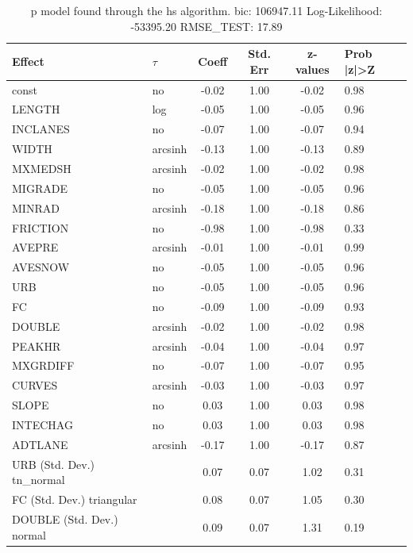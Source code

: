 \begin{table}
	\caption{p model found through the hs algorithm. bic: 106947.11 Log-Likelihood: -53395.20 RMSE_TEST: 17.89}
	\begin{center}
		\begin{tabular}{|l|l|c|c|c|l|}
			\hline
			Effect & $\tau$ & Coeff & Std. Err & z-values & Prob |z|>Z \\
			\hline
			const & no & -0.02 & 1.00 & -0.02 & 0.98 \\
			\hline
			LENGTH & log & -0.05 & 1.00 & -0.05 & 0.96 \\
			\hline
			INCLANES & no & -0.07 & 1.00 & -0.07 & 0.94 \\
			\hline
			WIDTH & arcsinh & -0.13 & 1.00 & -0.13 & 0.89 \\
			\hline
			MXMEDSH & arcsinh & -0.02 & 1.00 & -0.02 & 0.98 \\
			\hline
			MIGRADE & no & -0.05 & 1.00 & -0.05 & 0.96 \\
			\hline
			MINRAD & arcsinh & -0.18 & 1.00 & -0.18 & 0.86 \\
			\hline
			FRICTION & no & -0.98 & 1.00 & -0.98 & 0.33 \\
			\hline
			AVEPRE & arcsinh & -0.01 & 1.00 & -0.01 & 0.99 \\
			\hline
			AVESNOW & no & -0.05 & 1.00 & -0.05 & 0.96 \\
			\hline
			URB & no & -0.05 & 1.00 & -0.05 & 0.96 \\
			\hline
			FC & no & -0.09 & 1.00 & -0.09 & 0.93 \\
			\hline
			DOUBLE & arcsinh & -0.02 & 1.00 & -0.02 & 0.98 \\
			\hline
			PEAKHR & arcsinh & -0.04 & 1.00 & -0.04 & 0.97 \\
			\hline
			MXGRDIFF & no & -0.07 & 1.00 & -0.07 & 0.95 \\
			\hline
			CURVES & arcsinh & -0.03 & 1.00 & -0.03 & 0.97 \\
			\hline
			SLOPE & no & 0.03 & 1.00 & 0.03 & 0.98 \\
			\hline
			INTECHAG & no & 0.03 & 1.00 & 0.03 & 0.98 \\
			\hline
			ADTLANE & arcsinh & -0.17 & 1.00 & -0.17 & 0.87 \\
			\hline
			URB (Std. Dev.) tn_normal &  & 0.07 & 0.07 & 1.02 & 0.31 \\
			\hline
			FC (Std. Dev.) triangular &  & 0.08 & 0.07 & 1.05 & 0.30 \\
			\hline
			DOUBLE (Std. Dev.) normal &  & 0.09 & 0.07 & 1.31 & 0.19 \\

\end{tabular}
\end{center}
\end{table}
